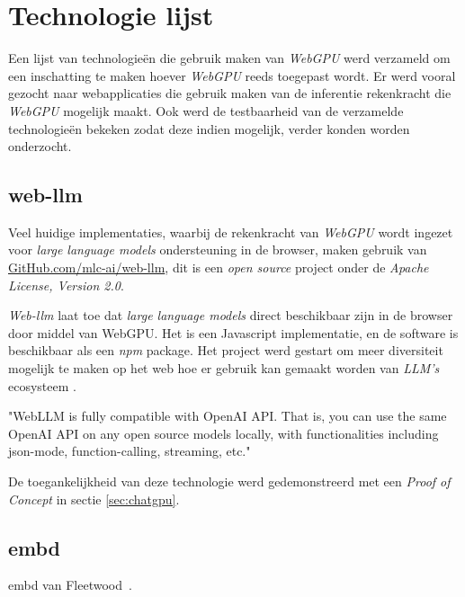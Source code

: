 \chapter{Technologie lijst}
\label{ch:technologylist}

Een lijst van technologieën die gebruik maken van \textit{WebGPU} werd verzameld om een inschatting te maken hoever \textit{WebGPU} reeds toegepast wordt. Er werd vooral gezocht naar webapplicaties die gebruik maken van de inferentie rekenkracht die \textit{WebGPU} mogelijk maakt. Ook werd de testbaarheid van de verzamelde technologieën bekeken zodat deze indien mogelijk, verder konden worden onderzocht.

\section{web-llm}

Veel huidige implementaties, waarbij de rekenkracht van \textit{WebGPU} wordt ingezet voor \textit{large language models} ondersteuning in de browser, maken gebruik van \href{https://github.com/mlc-ai/web-llm}{GitHub.com/mlc-ai/web-llm}, dit is een \textit{open source} project onder de \textit{Apache License, Version 2.0}.

\bigbreak{}

\textit{Web-llm} laat toe dat \textit{large language models} direct beschikbaar zijn in de browser door middel van WebGPU. Het is een Javascript implementatie, en de software is beschikbaar als een \textit{npm} package. Het project werd gestart om meer diversiteit mogelijk te maken op het web hoe er gebruik kan gemaakt worden van \textit{LLM's} ecosysteem \autocite{mlcai2024}.

\begin{displayquote}
    "WebLLM is fully compatible with OpenAI API. That is, you can use the same OpenAI API on any open source models locally, with functionalities including json-mode, function-calling, streaming, etc."
\end{displayquote}

De toegankelijkheid van deze technologie werd gedemonstreerd met een \textit{Proof of Concept} in sectie \ref{sec:chatgpu}.

\break{}

\section{embd}

embd van Fleetwood~\autocite{Fleetwood2023c}.

